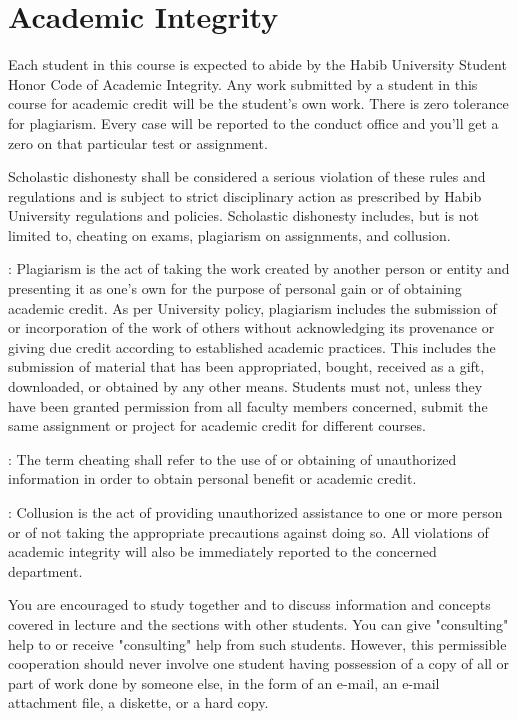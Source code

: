 \documentclass[a4paper]{article}
\begin{document}
\section{Academic Integrity}

Each student in this course is expected to abide by the Habib University Student Honor Code of Academic Integrity.  Any work submitted by a student in this course for academic credit will be the student's own work. There is zero tolerance for plagiarism. Every case will be reported to the conduct office and you'll get a zero on that particular test or assignment. 

Scholastic dishonesty shall be considered a serious violation of these rules and regulations and is subject to strict disciplinary action as prescribed by Habib University regulations and policies. Scholastic dishonesty includes, but is not limited to, cheating on exams, plagiarism on assignments, and collusion. 

: Plagiarism is the act of taking the work created by another person or entity and presenting it as one's own for the purpose of personal gain or of obtaining academic credit. As per University policy, plagiarism includes the submission of or incorporation of the work of others without acknowledging its provenance or giving due credit according to established academic practices. This includes the submission of material that has been appropriated, bought, received as a gift, downloaded, or obtained by any other means. Students must not, unless they have been granted permission from all faculty members concerned, submit the same assignment or project for academic credit for different courses. 

: The term cheating shall refer to the use of or obtaining of unauthorized information in order to obtain personal benefit or academic credit. 

: Collusion is the act of providing unauthorized assistance to one or more person or of not taking the appropriate precautions against doing so. 
All violations of academic integrity will also be immediately reported to the concerned department.  

You are encouraged to study together and to discuss information and concepts covered in lecture and the sections with other students. You can give "consulting" help to or receive "consulting" help from such students. However, this permissible cooperation should never involve one student having possession of a copy of all or part of work done by someone else, in the form of an e-mail, an e-mail attachment file, a diskette, or a hard copy. 
\end{document}
